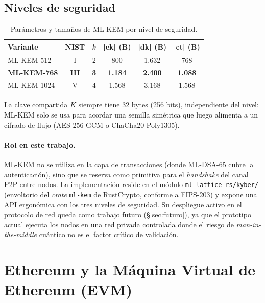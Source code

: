 \subsection{Niveles de seguridad}

\begin{table}[htbp]
\centering
\caption{Parámetros y tamaños de ML-KEM por nivel de seguridad.}
\label{tab:mlkem_params}
\begin{tabular}{@{}lccccc@{}}
\toprule
\textbf{Variante} & \textbf{NIST} & $k$ & \textbf{|ek| (B)} & \textbf{|dk| (B)} & \textbf{|ct| (B)} \\
\midrule
ML-KEM-512  & I   & 2 & 800   & 1.632 & 768   \\
\textbf{ML-KEM-768}  & \textbf{III} & \textbf{3} & \textbf{1.184} & \textbf{2.400} & \textbf{1.088} \\
ML-KEM-1024 & V   & 4 & 1.568 & 3.168 & 1.568 \\
\bottomrule
\end{tabular}
\end{table}

La clave compartida $K$ siempre tiene 32 bytes (256 bits), independiente del nivel: ML-KEM solo se usa para acordar una semilla simétrica que luego alimenta a un cifrado de flujo (AES-256-GCM o ChaCha20-Poly1305).

\paragraph{Rol en este trabajo.} ML-KEM no se utiliza en la capa de transacciones (donde ML-DSA-65 cubre la autenticación), sino que se reserva como primitiva para el \emph{handshake} del canal P2P entre nodos. La implementación reside en el módulo \texttt{ml-lattice-rs/kyber/} (envoltorio del \emph{crate} \texttt{ml-kem} de RustCrypto, conforme a FIPS-203) y expone una API ergonómica con los tres niveles de seguridad. Su despliegue activo en el protocolo de red queda como trabajo futuro (\S\ref{sec:futuro}), ya que el prototipo actual ejecuta los nodos en una red privada controlada donde el riesgo de \emph{man-in-the-middle} cuántico no es el factor crítico de validación.


\section{Ethereum y la Máquina Virtual de Ethereum (EVM)}
\label{sec:ethereum}

